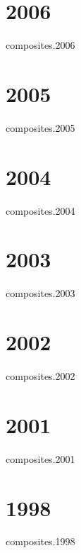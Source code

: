 \documentclass[12pt]{article}
\begin{document}
\section*{2006}
\begin{btSect}{composites.2006}
\btPrintAll
\end{btSect}
%
\section*{2005}
\begin{btSect}{composites.2005}
\btPrintAll
\end{btSect}
%
\section*{2004}
\begin{btSect}{composites.2004}
\btPrintAll
\end{btSect}
%
\section*{2003}
\begin{btSect}{composites.2003}
\btPrintAll
\end{btSect}
%
\section*{2002}
\begin{btSect}{composites.2002}
\btPrintAll
\end{btSect}
%
\section*{2001}
\begin{btSect}{composites.2001}
\btPrintAll
\end{btSect}
%
%

\section*{1998}
\begin{btSect}{composites.1998}
\btPrintAll
\end{btSect}
\end{document}
